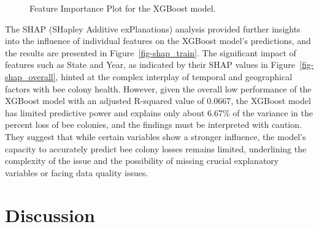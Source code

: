 \documentclass[
  letterpaper,
  DIV=11,
  numbers=noendperiod]{scrartcl}
\begin{document}
\begin{figure}


\caption{\label{fig-shap\_overall}Feature Importance Plot for the
XGBoost model.}

\end{figure}%

The SHAP (SHapley Additive exPlanations) analysis provided further
insights into the influence of individual features on the XGBoost
model's predictions, and the results are presented in
Figure~\ref{fig-shap_train}. The significant impact of features such as
State and Year, as indicated by their SHAP values in
Figure~\ref{fig-shap_overall}, hinted at the complex interplay of
temporal and geographical factors with bee colony health. However, given
the overall low performance of the XGBoost model with an adjusted
R-squared value of 0.0667, the XGBoost model has limited predictive
power and explains only about 6.67\% of the variance in the percent loss
of bee colonies, and the findings must be interpreted with caution. They
suggest that while certain variables show a stronger influence, the
model's capacity to accurately predict bee colony losses remains
limited, underlining the complexity of the issue and the possibility of
missing crucial explanatory variables or facing data quality issues.

\section{Discussion}\label{discussion}
\end{document}
